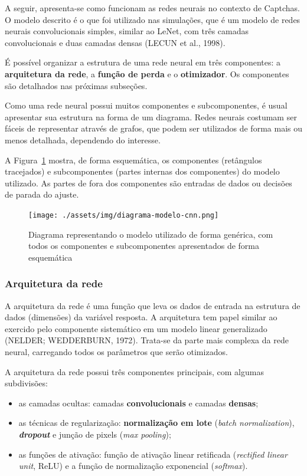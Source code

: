 \documentclass[12pt,twoside,brazilian]{book}
\providecommand{\tightlist}{%
  \setlength{\itemsep}{0pt}\setlength{\parskip}{0pt}}
\begin{document}
A seguir, apresenta-se como funcionam as redes neurais no contexto de
Captchas. O modelo descrito é o que foi utilizado nas simulações, que é
um modelo de redes neurais convolucionais simples, similar ao LeNet, com
três camadas convolucionais e duas camadas densas (LECUN et al., 1998).

É possível organizar a estrutura de uma rede neural em três componentes:
a \textbf{arquitetura da rede}, a \textbf{função de perda} e o
\textbf{otimizador}. Os componentes são detalhados nas próximas
subseções.

Como uma rede neural possui muitos componentes e subcomponentes, é usual
apresentar sua estrutura na forma de um diagrama. Redes neurais costumam
ser fáceis de representar através de grafos, que podem ser utilizados de
forma mais ou menos detalhada, dependendo do interesse.

A Figura~\ref{fig-diagrama-modelo-cnn} mostra, de forma esquemática, os
componentes (retângulos tracejados) e subcomponentes (partes internas
dos componentes) do modelo utilizado. As partes de fora dos componentes
são entradas de dados ou decisões de parada do ajuste.

\begin{figure}

{\centering \texttt{[image: ./assets/img/diagrama-modelo-cnn.png]}

}

\caption{\label{fig-diagrama-modelo-cnn}Diagrama representando o modelo
utilizado de forma genérica, com todos os componentes e subcomponentes
apresentados de forma esquemática}

\end{figure}

\hypertarget{sec-arquitetura-rede}{%
\subsubsection{Arquitetura da rede}\label{sec-arquitetura-rede}}

A arquitetura da rede é uma função que leva os dados de entrada na
estrutura de dados (dimensões) da variável resposta. A arquitetura tem
papel similar ao exercido pelo componente sistemático em um modelo
linear generalizado (NELDER; WEDDERBURN, 1972). Trata-se da parte mais
complexa da rede neural, carregando todos os parâmetros que serão
otimizados.

A arquitetura da rede possui três componentes principais, com algumas
subdivisões:

\begin{itemize}
\tightlist
\item
  as camadas ocultas: camadas \textbf{convolucionais} e camadas
  \textbf{densas};
\item
  as técnicas de regularização: \textbf{normalização em lote}
  (\emph{batch normalization}), \textbf{\emph{dropout}} e junção de
  pixels (\emph{max pooling});
\item
  as funções de ativação: função de ativação linear retificada
  (\emph{rectified linear unit}, ReLU) e a função de normalização
  exponencial (\emph{softmax}).
\end{itemize}
\end{document}
